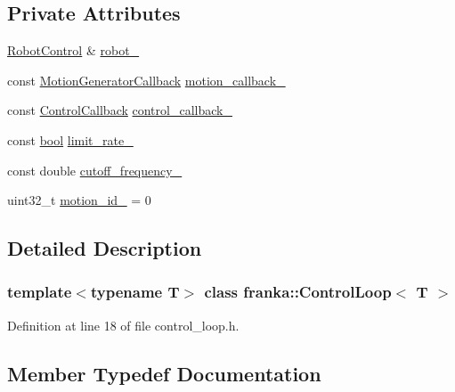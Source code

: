 \subsection*{Private Attributes}
\begin{DoxyCompactItemize}
\item 
\hyperlink{classfranka_1_1RobotControl}{Robot\+Control} \& \hyperlink{classfranka_1_1ControlLoop_aa618899fdcd85da8659fb3b1bd8c65b3}{robot\+\_\+}
\item 
const \hyperlink{classfranka_1_1ControlLoop_a23624d5a86fe2b206986af4757ba1822}{Motion\+Generator\+Callback} \hyperlink{classfranka_1_1ControlLoop_a8304d484624d562c70e3572d5037871b}{motion\+\_\+callback\+\_\+}
\item 
const \hyperlink{classfranka_1_1ControlLoop_a1b050245c6f2795d491899440f95cec3}{Control\+Callback} \hyperlink{classfranka_1_1ControlLoop_a71249c690ee56b2c099bbb4f29e92c95}{control\+\_\+callback\+\_\+}
\item 
const \hyperlink{classbool}{bool} \hyperlink{classfranka_1_1ControlLoop_a660f32d739c7f7ed05fa97b06220b98b}{limit\+\_\+rate\+\_\+}
\item 
const double \hyperlink{classfranka_1_1ControlLoop_a1c01098536341d3e1da2617a08129529}{cutoff\+\_\+frequency\+\_\+}
\item 
uint32\+\_\+t \hyperlink{classfranka_1_1ControlLoop_a4dd139afcabc3a50bb9eb35ca44845fa}{motion\+\_\+id\+\_\+} = 0
\end{DoxyCompactItemize}


\subsection{Detailed Description}
\subsubsection*{template$<$typename T$>$\newline
class franka\+::\+Control\+Loop$<$ T $>$}



Definition at line 18 of file control\+\_\+loop.\+h.



\subsection{Member Typedef Documentation}
\mbox{\label{classfranka_1_1ControlLoop_a1b050245c6f2795d491899440f95cec3}} 
